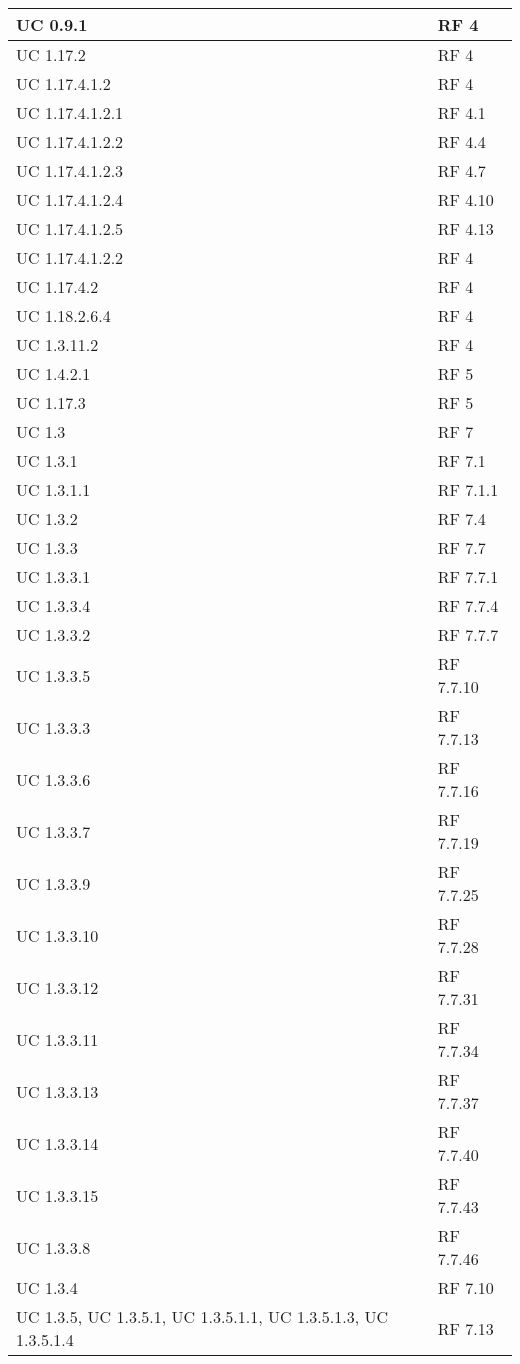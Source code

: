 {\begin{longtable} [c]{| p{4cm} | p{4cm} |}
 \hline 
UC 0.9.1 & RF 4\\ 
 \hline 
UC 1.17.2 & RF 4\\ 
 \hline 
UC 1.17.4.1.2 & RF 4\\ 
 \hline 
UC 1.17.4.1.2.1 & RF 4.1\\ 
 \hline 
UC 1.17.4.1.2.2 & RF 4.4\\ 
 \hline 
UC 1.17.4.1.2.3 & RF 4.7\\ 
 \hline 
UC 1.17.4.1.2.4 & RF 4.10\\ 
 \hline 
UC 1.17.4.1.2.5 & RF 4.13\\ 
 \hline 
UC 1.17.4.1.2.2 & RF 4\\ 
 \hline 
UC 1.17.4.2 & RF 4\\ 
 \hline 
UC 1.18.2.6.4 & RF 4\\ 
 \hline 
UC 1.3.11.2 & RF 4\\ 
 \hline 
UC 1.4.2.1 & RF 5\\ 
 \hline 
UC 1.17.3 & RF 5\\ 
 \hline 
UC 1.3 & RF 7\\ 
 \hline 
UC 1.3.1 & RF 7.1\\ 
 \hline 
UC 1.3.1.1 & RF 7.1.1\\ 
 \hline 
UC 1.3.2 & RF 7.4\\ 
 \hline 
UC 1.3.3 & RF 7.7\\ 
 \hline 
UC 1.3.3.1 & RF 7.7.1\\ 
 \hline 
UC 1.3.3.4 & RF 7.7.4\\ 
 \hline 
UC 1.3.3.2 & RF 7.7.7\\ 
 \hline 
UC 1.3.3.5 & RF 7.7.10\\ 
 \hline 
UC 1.3.3.3 & RF 7.7.13\\ 
 \hline 
UC 1.3.3.6 & RF 7.7.16\\ 
 \hline 
UC 1.3.3.7 & RF 7.7.19\\ 
 \hline 
UC 1.3.3.9 & RF 7.7.25\\ 
 \hline 
UC 1.3.3.10 & RF 7.7.28\\ 
 \hline 
UC 1.3.3.12 & RF 7.7.31\\ 
 \hline 
UC 1.3.3.11 & RF 7.7.34\\ 
 \hline 
UC 1.3.3.13 & RF 7.7.37\\ 
 \hline 
UC 1.3.3.14 & RF 7.7.40\\ 
 \hline 
UC 1.3.3.15 & RF 7.7.43\\ 
 \hline 
UC 1.3.3.8 & RF 7.7.46\\ 
 \hline 
UC 1.3.4 & RF 7.10\\ 
 \hline 
UC 1.3.5, UC 1.3.5.1, UC 1.3.5.1.1, UC 1.3.5.1.3, UC 1.3.5.1.4 & RF 7.13\\ 

\end{longtable}}
